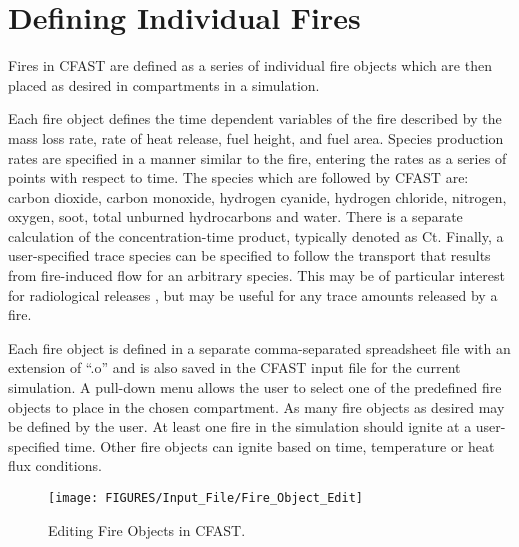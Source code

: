 \section{Defining Individual Fires}
\label{sec:fire_inputs}

Fires in CFAST are defined as a series of individual fire objects which are then placed as desired in compartments in a simulation.

Each fire object defines the time dependent variables of the fire described by the mass loss rate, rate of heat release, fuel height, and fuel area.  Species production rates are specified in a manner similar to the fire, entering the rates as a series of points with respect to time.  The species which are followed by CFAST are: carbon dioxide, carbon monoxide, hydrogen cyanide, hydrogen chloride, nitrogen, oxygen, soot, total unburned hydrocarbons and water. There is a separate calculation of the concentration-time product, typically denoted as Ct. Finally, a user-specified trace species can be specified to follow the transport that results from fire-induced flow for an arbitrary species. This may be of particular interest for radiological releases \cite{Jones:2008}, but may be useful for any trace amounts released by a fire.

Each fire object is defined in a separate comma-separated spreadsheet file with an extension of ``.o'' and is also saved in the CFAST input file for the current simulation. A pull-down menu allows the user to select one of the predefined fire objects to place in the chosen compartment. As many fire objects as desired may be defined by the user.  At least one fire in the simulation should ignite at a user-specified time.  Other fire objects can ignite based on time, temperature or heat flux conditions.

\begin{figure}[h!]
\begin{center}
\texttt{[image: FIGURES/Input\_File/Fire\_Object\_Edit]}
\caption[Editing Fire Objects in CFAST]{Editing Fire Objects in CFAST.}
\end{center}
\end{figure}

